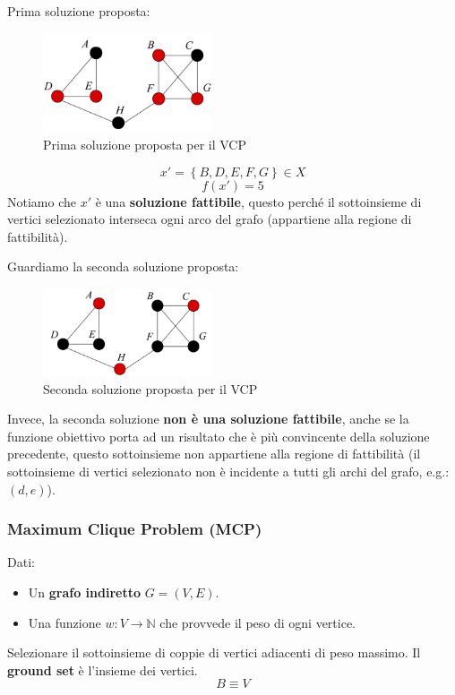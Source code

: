 \documentclass{article}
\begin{document}
Prima soluzione proposta:
\begin{figure}[H]
    \centering
    \includegraphics[width=5cm]{images/VCP_sol1.png}
    \caption{Prima soluzione proposta per il VCP}
    \label{fig:fst_sol_VCP}
\end{figure}

$$x'=\left\{ B,D,E,F,G \right\} \in X$$
$$f(x')=5$$
Notiamo che $x'$ è una \textbf{soluzione fattibile}, questo perché il sottoinsieme di vertici selezionato interseca
ogni arco del grafo (appartiene alla regione di fattibilità).

Guardiamo la seconda soluzione proposta:
\begin{figure}[H]
    \centering
    \includegraphics[width=5cm]{images/VCP_sol2.png}
    \caption{Seconda soluzione proposta per il VCP}
    \label{fig:snd_sol_VCP}
\end{figure}

Invece, la seconda soluzione \textbf{non è una soluzione fattibile}, anche se la funzione obiettivo porta ad un
risultato che è più convincente della soluzione precedente, questo sottoinsieme non appartiene alla regione di
fattibilità (il sottoinsieme di vertici selezionato non è incidente a tutti gli archi del grafo, e.g.: $(d,e)$).

\subsubsection{Maximum Clique Problem (MCP)}
Dati:
\begin{itemize}
    \item Un \textbf{grafo indiretto} $G=(V,E)$.
    \item Una funzione $w:V\rightarrow \mathbb{N}$ che provvede il peso di ogni vertice.
\end{itemize}
Selezionare il sottoinsieme di coppie di vertici adiacenti di peso massimo. Il \textbf{ground set} è l'insieme
dei vertici.
$$B\equiv V$$
\end{document}

